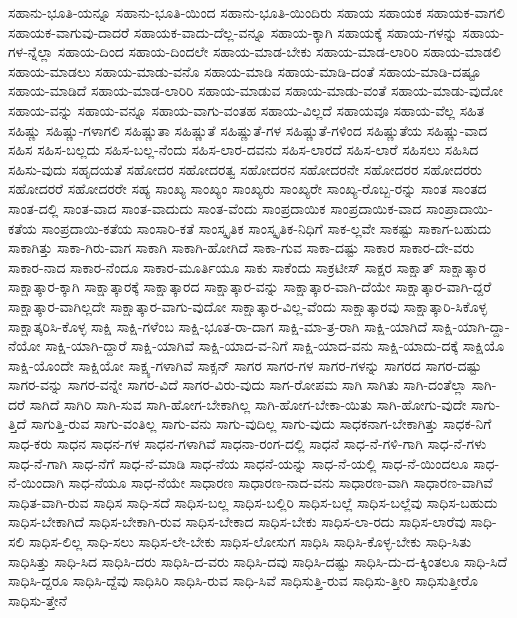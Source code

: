 {ಸಹಾನು-ಭೂತಿ-ಯನ್ನೂ
ಸಹಾನು-ಭೂತಿ-ಯಿಂದ
ಸಹಾನು-ಭೂತಿ-ಯಿಂದಿರು
ಸಹಾಯ
ಸಹಾಯಕ
ಸಹಾಯಕ-ವಾಗಲಿ
ಸಹಾಯಕ-ವಾಗುವು-ದಾದರೆ
ಸಹಾಯಕ-ವಾದು-ದೆಲ್ಲ-ವನ್ನೂ
ಸಹಾಯ-ಕ್ಕಾಗಿ
ಸಹಾಯಕ್ಕೆ
ಸಹಾಯ-ಗಳನ್ನು
ಸಹಾಯ-ಗಳ-ನ್ನೆಲ್ಲಾ
ಸಹಾಯ-ದಿಂದ
ಸಹಾಯ-ದಿಂದಲೇ
ಸಹಾಯ-ಮಾಡ-ಬೇಕು
ಸಹಾಯ-ಮಾಡ-ಲಾರಿರಿ
ಸಹಾಯ-ಮಾಡಲಿ
ಸಹಾಯ-ಮಾಡಲು
ಸಹಾಯ-ಮಾಡು-ವನೊ
ಸಹಾಯ-ಮಾಡಿ
ಸಹಾಯ-ಮಾಡಿ-ದಂತೆ
ಸಹಾಯ-ಮಾಡಿ-ದಷ್ಟೂ
ಸಹಾಯ-ಮಾಡಿದೆ
ಸಹಾಯ-ಮಾಡ-ಲಾರಿರಿ
ಸಹಾಯ-ಮಾಡುವ
ಸಹಾಯ-ಮಾಡು-ವಂತೆ
ಸಹಾಯ-ಮಾಡು-ವುದೋ
ಸಹಾಯ-ವನ್ನು
ಸಹಾಯ-ವನ್ನೂ
ಸಹಾಯ-ವಾಗು-ವಂತಹ
ಸಹಾಯ-ವಿಲ್ಲದೆ
ಸಹಾಯವೂ
ಸಹಾಯ-ವೆಲ್ಲ
ಸಹಿತ
ಸಹಿಷ್ಣು
ಸಹಿಷ್ಣು-ಗಳಾಗಲಿ
ಸಹಿಷ್ಣುತಾ
ಸಹಿಷ್ಣುತೆ
ಸಹಿಷ್ಣುತೆ-ಗಳ
ಸಹಿಷ್ಣುತೆ-ಗಳಿಂದ
ಸಹಿಷ್ಣುತೆಯ
ಸಹಿಷ್ಣು-ವಾದ
ಸಹಿಸ
ಸಹಿಸ-ಬಲ್ಲದು
ಸಹಿಸ-ಬಲ್ಲ-ನೆಂದು
ಸಹಿಸ-ಲಾರ-ದವನು
ಸಹಿಸ-ಲಾರದೆ
ಸಹಿಸ-ಲಾರೆ
ಸಹಿಸಲು
ಸಹಿಸಿದ
ಸಹಿಸು-ವುದು
ಸಹೃದಯತೆ
ಸಹೋದರ
ಸಹೋದರತ್ವ
ಸಹೋದರನ
ಸಹೋದರನೇ
ಸಹೋದರರ
ಸಹೋದರರು
ಸಹೋದರರೆ
ಸಹೋದರರೇ
ಸಹ್ಯ
ಸಾಂಖ್ಯ
ಸಾಂಖ್ಯಂ
ಸಾಂಖ್ಯರು
ಸಾಂಖ್ಯರೇ
ಸಾಂಖ್ಯ-ರೊಬ್ಬ-ರನ್ನು
ಸಾಂತ
ಸಾಂತದ
ಸಾಂತ-ದಲ್ಲಿ
ಸಾಂತ-ವಾದ
ಸಾಂತ-ವಾದುದು
ಸಾಂತ-ವೆಂದು
ಸಾಂಪ್ರದಾಯಿಕ
ಸಾಂಪ್ರದಾಯಿಕ-ವಾದ
ಸಾಂಪ್ರಾದಾಯಿ-ಕತೆಯ
ಸಾಂಪ್ರದಾಯಿ-ಕತೆಯ
ಸಾಂಸಾರಿ-ಕತೆ
ಸಾಂಸ್ಕೃತಿಕ
ಸಾಂಸ್ಕೃತಿಕ-ನಿಧಿಗೆ
ಸಾಕ-ಲ್ಲವೇ
ಸಾಕಷ್ಟು
ಸಾಕಾಗ-ಬಹುದು
ಸಾಕಾಗಿತ್ತು
ಸಾಕಾ-ಗಿರು-ವಾಗ
ಸಾಕಾಗಿ
ಸಾಕಾಗಿ-ಹೋಗಿದೆ
ಸಾಕಾ-ಗುವ
ಸಾಕಾ-ದಷ್ಟು
ಸಾಕಾರ
ಸಾಕಾರ-ದೇ-ವರು
ಸಾಕಾರ-ನಾದ
ಸಾಕಾರ-ನೆಂದೂ
ಸಾಕಾರ-ಮೂರ್ತಿಯೂ
ಸಾಕು
ಸಾಕೆಂದು
ಸಾಕ್ರಟೀಸ್
ಸಾಕ್ಷರ
ಸಾಕ್ಷಾತ್
ಸಾಕ್ಷಾತ್ಕಾರ
ಸಾಕ್ಷಾತ್ಕಾರ-ಕ್ಕಾಗಿ
ಸಾಕ್ಷಾತ್ಕಾರಕ್ಕೆ
ಸಾಕ್ಷಾತ್ಕಾರದ
ಸಾಕ್ಷಾತ್ಕಾರ-ವನ್ನು
ಸಾಕ್ಷಾತ್ಕಾರ-ವಾಗಿ-ದೆಯೇ
ಸಾಕ್ಷಾತ್ಕಾರ-ವಾಗಿ-ದ್ದರೆ
ಸಾಕ್ಷಾತ್ಕಾರ-ವಾಗಿಲ್ಲದೇ
ಸಾಕ್ಷಾತ್ಕಾರ-ವಾಗು-ವುದೋ
ಸಾಕ್ಷಾತ್ಕಾರ-ವಿಲ್ಲ-ವೆಂದು
ಸಾಕ್ಷಾತ್ಕಾರವು
ಸಾಕ್ಷಾತ್ಕಾರಿ-ಸಿಕೊಳ್ಳ
ಸಾಕ್ಷಾತ್ಕರಿಸಿ-ಕೊಳ್ಳ
ಸಾಕ್ಷಿ
ಸಾಕ್ಷಿ-ಗಳೆಂಬ
ಸಾಕ್ಷಿ-ಭೂತ-ರಾ-ದಾಗ
ಸಾಕ್ಷಿ-ಮಾ-ತ್ರ-ರಾಗಿ
ಸಾಕ್ಷಿ-ಯಾಗಿದೆ
ಸಾಕ್ಷಿ-ಯಾಗಿ-ದ್ದಾ-ನೆಯೋ
ಸಾಕ್ಷಿ-ಯಾಗಿ-ದ್ದಾರೆ
ಸಾಕ್ಷಿ-ಯಾಗಿವೆ
ಸಾಕ್ಷಿ-ಯಾದ-ವ-ನಿಗೆ
ಸಾಕ್ಷಿ-ಯಾದ-ವನು
ಸಾಕ್ಷಿ-ಯಾದು-ದಕ್ಕೆ
ಸಾಕ್ಷಿಯೊ
ಸಾಕ್ಷಿ-ಯೊಂದೇ
ಸಾಕ್ಷಿಯೋ
ಸಾಕ್ಷ್ಯ-ಗಳಾಗಿವೆ
ಸಾಕ್ಸನ್
ಸಾಗರ
ಸಾಗರ-ಗಳ
ಸಾಗರ-ಗಳನ್ನು
ಸಾಗರದ
ಸಾಗರ-ದಷ್ಟು
ಸಾಗರ-ವನ್ನು
ಸಾಗರ-ವನ್ನೇ
ಸಾಗರ-ವಿದೆ
ಸಾಗರ-ವಿರು-ವುದು
ಸಾಗ-ರೋಪಮ
ಸಾಗಿ
ಸಾಗಿತು
ಸಾಗಿ-ದಂತೆಲ್ಲಾ
ಸಾಗಿ-ದರೆ
ಸಾಗಿದೆ
ಸಾಗಿರಿ
ಸಾಗಿ-ಸುವ
ಸಾಗಿ-ಹೋಗ-ಬೇಕಾಗಿಲ್ಲ
ಸಾಗಿ-ಹೋಗ-ಬೇಕಾ-ಯಿತು
ಸಾಗಿ-ಹೋಗು-ವುದೇ
ಸಾಗು-ತ್ತಿದೆ
ಸಾಗುತ್ತಿ-ರುವ
ಸಾಗು-ವಂತಿಲ್ಲ
ಸಾಗು-ವನು
ಸಾಗು-ವುದಿಲ್ಲ
ಸಾಗು-ವುದು
ಸಾಧಕನಾಗ-ಬೇಕಾಗಿತ್ತು
ಸಾಧಕ-ನಿಗೆ
ಸಾಧ-ಕರು
ಸಾಧನ
ಸಾಧನ-ಗಳ
ಸಾಧನ-ಗಳಾಗಿವೆ
ಸಾಧನಾ-ರಂಗ-ದಲ್ಲಿ
ಸಾಧನೆ
ಸಾಧ-ನೆ-ಗಳಿ-ಗಾಗಿ
ಸಾಧ-ನೆ-ಗಳು
ಸಾಧ-ನೆ-ಗಾಗಿ
ಸಾಧ-ನೆಗೆ
ಸಾಧ-ನೆ-ಮಾಡಿ
ಸಾಧ-ನೆಯ
ಸಾಧನೆ-ಯನ್ನು
ಸಾಧ-ನೆ-ಯಲ್ಲಿ
ಸಾಧ-ನೆ-ಯಿಂದಲೂ
ಸಾಧ-ನೆ-ಯಿಂದಾಗಿ
ಸಾಧ-ನೆಯೂ
ಸಾಧ-ನೆಯೇ
ಸಾಧಾರಣ
ಸಾಧಾರಣ-ನಾದ-ವನು
ಸಾಧಾರಣ-ವಾಗಿ
ಸಾಧಾರಣ-ವಾಗಿವೆ
ಸಾಧಿತ-ವಾಗಿ-ರುವ
ಸಾಧಿಸ
ಸಾಧಿ-ಸದೆ
ಸಾಧಿಸ-ಬಲ್ಲ
ಸಾಧಿಸ-ಬಲ್ಲಿರಿ
ಸಾಧಿಸ-ಬಲ್ಲೆ
ಸಾಧಿಸ-ಬಲ್ಲೆವು
ಸಾಧಿಸ-ಬಹುದು
ಸಾಧಿಸ-ಬೇಕಾಗಿದೆ
ಸಾಧಿಸ-ಬೇಕಾಗಿ-ರುವ
ಸಾಧಿಸ-ಬೇಕಾದ
ಸಾಧಿಸ-ಬೇಕು
ಸಾಧಿಸ-ಲಾ-ರದು
ಸಾಧಿಸ-ಲಾರೆವು
ಸಾಧಿ-ಸಲಿ
ಸಾಧಿಸ-ಲಿಲ್ಲ
ಸಾಧಿ-ಸಲು
ಸಾಧಿಸ-ಲೇ-ಬೇಕು
ಸಾಧಿಸ-ಲೋಸುಗ
ಸಾಧಿಸಿ
ಸಾಧಿಸಿ-ಕೊಳ್ಳ-ಬೇಕು
ಸಾಧಿ-ಸಿತು
ಸಾಧಿಸಿತ್ತು
ಸಾಧಿ-ಸಿದ
ಸಾಧಿಸಿ-ದರು
ಸಾಧಿಸಿ-ದ-ವರು
ಸಾಧಿಸಿ-ದವು
ಸಾಧಿಸಿ-ದಷ್ಟು
ಸಾಧಿಸಿ-ದು-ದ-ಕ್ಕಿಂತಲೂ
ಸಾಧಿ-ಸಿದೆ
ಸಾಧಿಸಿ-ದ್ದರೂ
ಸಾಧಿಸಿ-ದ್ದೆವು
ಸಾಧಿಸಿರಿ
ಸಾಧಿಸಿ-ರುವ
ಸಾಧಿ-ಸಿವೆ
ಸಾಧಿಸುತ್ತಿ-ರುವ
ಸಾಧಿಸು-ತ್ತೀರಿ
ಸಾಧಿಸುತ್ತೀರೊ
ಸಾಧಿಸು-ತ್ತೇನೆ
}
